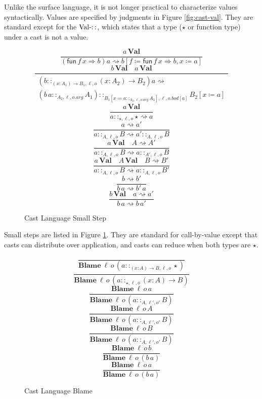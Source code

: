 Unlike the surface language, it is not longer practical to characterize
values syntactically. Values are specified by judgments in Figure
\ref{fig:cast-val}. They are standard except for the $\operatorname{Val-::}$,
which states that a type ($\star$ or function type) under a cast
is not a value.

\begin{figure}
\[
\frac{a\,\textbf{Val}}{\left(\mathsf{fun}\,f\,x\Rightarrow b\right)a\rightsquigarrow b\left[f\coloneqq\mathsf{fun}\,f\,x\Rightarrow b,x\coloneqq a\right]}
\]
\[
\frac{b\,\textbf{Val}\quad a\,\textbf{Val}}{\begin{array}{c}
\left(b::_{\left(x:A_{1}\right)\rightarrow B_{1},\ensuremath{\ell},o}\left(x:A_{2}\right)\rightarrow B_{2}\right)a\rightsquigarrow\\
\left(b\,a::_{A_{2},\ell,o.arg}A_{1}\right)::_{B_{1}\left[x\coloneqq a::_{A_{2},\ell,o.arg}A_{1}\right],\ensuremath{\ell},o.bod[a]}B_{2}\left[x\coloneqq a\right]
\end{array}}
\]
\[
\frac{a\,\textbf{Val}}{a::_{\star,\ensuremath{\ell},o}\star\rightsquigarrow a}
\]
\[
\frac{a\rightsquigarrow a'}{a::_{A,\ensuremath{\ell},o}B\rightsquigarrow a'::_{A,\ensuremath{\ell},o}B}
\]
\[
\frac{a\,\textbf{Val}\quad A\rightsquigarrow A'}{a::_{A,\ensuremath{\ell},o}B\rightsquigarrow a::_{A',\ensuremath{\ell},o}B}
\]
\[
\frac{a\,\textbf{Val}\quad A\,\textbf{Val}\quad B\rightsquigarrow B'}{a::_{A,\ensuremath{\ell},o}B\rightsquigarrow a::_{A,\ensuremath{\ell},o}B'}
\]
\[
\frac{b\rightsquigarrow b'}{b\,a\rightsquigarrow b'\,a}
\]
\[
\frac{b\,\textbf{Val}\quad a\rightsquigarrow a'}{b\,a\rightsquigarrow b\,a'}
\]

\caption{Cast Language Small Step}
\label{fig:cast-step}
\end{figure}

Small steps are listed in Figure \ref{fig:cast-step}. They are standard
for call-by-value except that casts can distribute over application,
and casts can reduce when both types are $\star$.

\begin{figure}
\[
\frac{\,}{\textbf{Blame}\:\ensuremath{\ell}\,o\,\left(a::_{\left(x:A\right)\rightarrow B,\ensuremath{\ell},o}\star\right)}
\]
\[
\frac{\,}{\textbf{Blame}\:\ensuremath{\ell}\,o\,\left(a::_{\star,\ensuremath{\ell},o}\left(x:A\right)\rightarrow B\right)}
\]
\[
\frac{\textbf{Blame}\:\ensuremath{\ell}\,o\,a}{\textbf{Blame}\:\ensuremath{\ell}\,o\,\left(a::_{A,\ensuremath{\ell'},o'}B\right)}
\]
\[
\frac{\textbf{Blame}\:\ensuremath{\ell}\,o\,A}{\textbf{Blame}\:\ensuremath{\ell}\,o\,\left(a::_{A,\ensuremath{\ell'},o'}B\right)}
\]
\[
\frac{\textbf{Blame}\:\ensuremath{\ell}\,o\,B}{\textbf{Blame}\:\ensuremath{\ell}\,o\,\left(a::_{A,\ensuremath{\ell'},o'}B\right)}
\]
\[
\frac{\textbf{Blame}\:\ensuremath{\ell}\,o\,b}{\textbf{Blame}\:\ensuremath{\ell}\,o\,\left(b\,a\right)}
\]
\[
\frac{\textbf{Blame}\:\ensuremath{\ell}\,o\,a}{\textbf{Blame}\:\ensuremath{\ell}\,o\,\left(b\,a\right)}
\]
\caption{Cast Language Blame}
\label{fig:cast-blame}
\end{figure}


